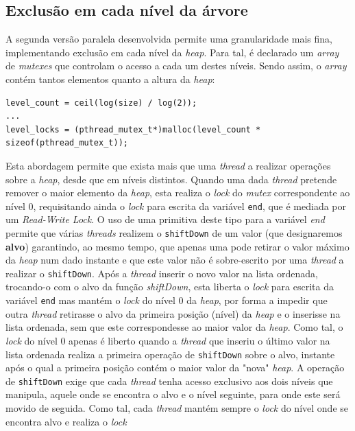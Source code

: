 \documentclass{article}
\begin{document}
\subsection{Exclusão em cada nível da árvore}
A segunda versão paralela desenvolvida permite uma granularidade mais fina, implementando exclusão em cada nível da \textit{heap}. 
Para tal, é declarado um \textit{array} de \textit{mutexes} que controlam o acesso a cada um destes níveis. Sendo assim, o \textit{array}
contém tantos elementos quanto a altura da \textit{heap}: 

\footnotesize 
\begin{verbatim}
level_count = ceil(log(size) / log(2));
...
level_locks = (pthread_mutex_t*)malloc(level_count * sizeof(pthread_mutex_t));
\end{verbatim}
\normalsize
Esta abordagem permite que exista mais que uma \textit{thread} a realizar operações sobre a \textit{heap}, desde que em níveis distintos.
Quando uma dada \textit{thread} pretende remover o maior elemento da \textit{heap}, esta realiza o \textit{lock} do \textit{mutex} correspondente
ao nível 0, requisitando ainda o \textit{lock} para escrita da variável \texttt{end}, que é mediada por um \textit{Read-Write Lock}. 
O uso de uma primitiva deste tipo para a variável \textit{end} permite que várias \textit{threads} realizem o \texttt{shiftDown} de um valor 
(que designaremos \textbf{alvo}) garantindo, ao mesmo tempo, que apenas uma pode retirar o valor máximo da \textit{heap} num dado instante e 
que este valor não é sobre-escrito por uma \textit{thread} a realizar o \texttt{shiftDown}. Após a \textit{thread} inserir o novo valor na 
lista ordenada, trocando-o com o alvo da função \textit{shiftDown}, esta liberta o \textit{lock} para escrita da variável \texttt{end} mas 
mantém o \textit{lock} do nível 0 da \textit{heap}, por forma a impedir que outra \textit{thread} retirasse o alvo da primeira posição (nível) 
da \textit{heap} e o inserisse na lista ordenada, sem que este correspondesse ao maior valor da \textit{heap}. Como tal, o \textit{lock} do 
nível 0 apenas é liberto quando a \textit{thread} que inseriu o último valor na lista ordenada realiza a primeira operação de \texttt{shiftDown} 
sobre o alvo, instante após o qual a primeira posição contém o maior valor da "nova" \textit{heap}. A operação de \texttt{shiftDown} exige que 
cada \textit{thread} tenha acesso exclusivo aos dois níveis que manipula, aquele onde se encontra o alvo e o nível seguinte, para onde este 
será movido de seguida. Como tal, cada \textit{thread} mantém sempre o \textit{lock} do nível onde se encontra alvo e realiza o \textit{lock} 
\end{document}
